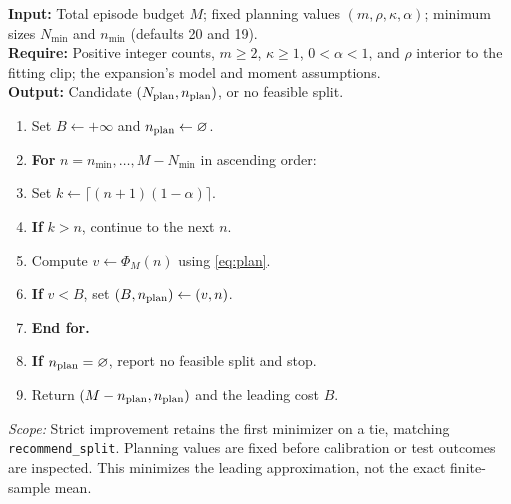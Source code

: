 \begin{algorithm}[t]
\caption{Prespecified integer split planning}
\label{alg:split}
\small
\textbf{Input:} Total episode budget $M$; fixed planning values $(m,\rho,\kappa,\alpha)$; minimum sizes $N_{\min}$ and $n_{\min}$ (defaults 20 and 19).\\
\textbf{Require:} Positive integer counts, $m\geq2$, $\kappa\geq1$, $0<\alpha<1$, and $\rho$ interior to the fitting clip; the expansion's model and moment assumptions.\\
\textbf{Output:} Candidate $(N_{\rm plan},n_{\rm plan})$, or no feasible split.
\begin{enumerate}[label=\arabic*:,leftmargin=1.7em,itemsep=3pt,topsep=5pt]
\item Set $B\gets+\infty$ and $n_{\rm plan}\gets\varnothing$.
\item \textbf{For} $n=n_{\min},\ldots,M-N_{\min}$ in ascending order:
\item \hspace*{.5em}Set $k\gets\lceil(n+1)(1-\alpha)\rceil$.
\item \hspace*{.5em}\textbf{If} $k>n$, continue to the next $n$.
\item \hspace*{.5em}Compute $v\gets\Phi_M(n)$ using \eqref{eq:plan}.
\item \hspace*{.5em}\textbf{If} $v<B$, set $(B,n_{\rm plan})\gets(v,n)$.
\item \textbf{End for.}
\item \textbf{If} $n_{\rm plan}=\varnothing$, report no feasible split and stop.
\item Return $(M-n_{\rm plan},n_{\rm plan})$ and the leading cost $B$.
\end{enumerate}
\textit{Scope:} Strict improvement retains the first minimizer on a tie, matching \texttt{recommend\_split}. Planning values are fixed before calibration or test outcomes are inspected. This minimizes the leading approximation, not the exact finite-sample mean.
\end{algorithm}
